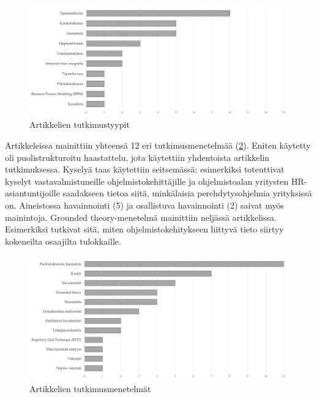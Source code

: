 \documentclass[utf8]{gradu3}
\begin{document}
\begin{figure}[h]
    \centering
    \includegraphics[width=\textwidth]{media/tutkimustyypit.png}
    \caption{Artikkelien tutkimustyypit}
    \label{kuvio:tutkimustyypit}
\end{figure}

Artikkeleissa mainittiin yhteensä 12 eri tutkimusmenetelmää (\ref{kuvio:tutkimusmenetelmat}). Eniten käytetty oli puolistrukturoitu haastattelu, jota käytettiin yhdentoista artikkelin tutkimuksessa. Kyselyä taas käytettiin seitsemässä: esimerkiksi \textcite{kulkarni-ym-2010} toteuttivat kyselyt vastavalmistuneille ohjelmistokehittäjille ja ohjelmistoalan yritysten HR-asiantuntijoille saadakseen tietoa siitä, minkälaisia perehdytysohjelmia yrityksissä on. Aineistossa havainnointi (5) ja osallistuva havainnointi (2) saivat myös mainintoja. Grounded theory-menetelmä mainittiin neljässä artikkelissa. Esimerkiksi \textcite{viana-ym-2014} tutkivat sitä, miten ohjelmistokehitykseen liittyvä tieto siirtyy kokeneilta osaajilta tulokkaille. 

\begin{figure}[h]
    \centering
    \includegraphics[width=\textwidth]{media/menetelmat.png}
    \caption{Artikkelien tutkimusmenetelmät}
    \label{kuvio:tutkimusmenetelmat}
\end{figure}
\end{document}
